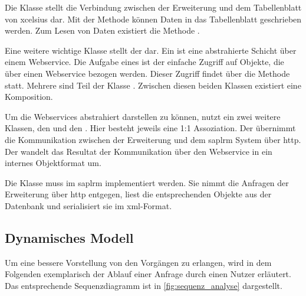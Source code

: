 \begin{onehalfspacing}
Die Klasse  stellt die Verbindung zwischen der Erweiterung und dem Tabellenblatt von \gls{xcelsius} dar. Mit der Methode  können Daten in das Tabellenblatt geschrieben werden. Zum Lesen von Daten existiert die Methode .

Eine weitere wichtige Klasse stellt der  dar. Ein  ist eine abstrahierte Schicht über einem Webservice. Die Aufgabe eines  ist der einfache Zugriff auf Objekte, die über einen Webservice bezogen werden. Dieser Zugriff findet über die Methode  statt. Mehrere  sind Teil der Klasse . Zwischen diesen beiden Klassen existiert eine Komposition.

Um die Webservices abstrahiert darstellen zu können, nutzt ein  zwei weitere Klassen, den  und den . Hier besteht jeweils eine 1:1 Assoziation. Der  übernimmt die Kommunikation zwischen der Erweiterung und dem \gls{saplrm} System über \gls{http}. Der  wandelt das Resultat der Kommunikation über den Webservice in ein internes Objektformat um.

Die Klasse  muss im \gls{saplrm} implementiert werden. Sie nimmt die Anfragen der Erweiterung über \gls{http} entgegen, liest die entsprechenden Objekte aus der Datenbank und serialisiert sie im \gls{xml}-Format.

\subsection{Dynamisches Modell}
Um eine bessere Vorstellung von den Vorgängen zu erlangen, wird in dem Folgenden exemplarisch der Ablauf einer Anfrage durch einen Nutzer erläutert. Das entsprechende Sequenzdiagramm ist in \vref{fig:sequenz_analyse} dargestellt.


\end{onehalfspacing}
